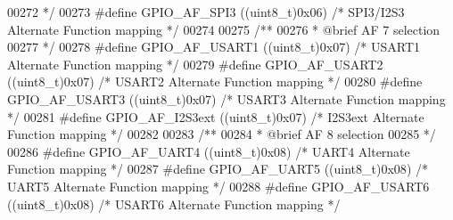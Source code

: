 \begin{DoxyCode}
00272 \textcolor{comment}{  */}
00273 \textcolor{preprocessor}{#}\textcolor{preprocessor}{define} \textcolor{preprocessor}{GPIO\_AF\_SPI3}          \textcolor{preprocessor}{(}\textcolor{preprocessor}{(}\textcolor{preprocessor}{uint8\_t}\textcolor{preprocessor}{)}0x06\textcolor{preprocessor}{)}  \textcolor{comment}{/* SPI3/I2S3 Alternate Function mapping */}
00274 
00275 \textcolor{comment}{/** }
00276 \textcolor{comment}{  * @brief   AF 7 selection  }
00277 \textcolor{comment}{  */}
00278 \textcolor{preprocessor}{#}\textcolor{preprocessor}{define} \textcolor{preprocessor}{GPIO\_AF\_USART1}        \textcolor{preprocessor}{(}\textcolor{preprocessor}{(}\textcolor{preprocessor}{uint8\_t}\textcolor{preprocessor}{)}0x07\textcolor{preprocessor}{)}  \textcolor{comment}{/* USART1 Alternate Function mapping */}
00279 \textcolor{preprocessor}{#}\textcolor{preprocessor}{define} \textcolor{preprocessor}{GPIO\_AF\_USART2}        \textcolor{preprocessor}{(}\textcolor{preprocessor}{(}\textcolor{preprocessor}{uint8\_t}\textcolor{preprocessor}{)}0x07\textcolor{preprocessor}{)}  \textcolor{comment}{/* USART2 Alternate Function mapping */}
00280 \textcolor{preprocessor}{#}\textcolor{preprocessor}{define} \textcolor{preprocessor}{GPIO\_AF\_USART3}        \textcolor{preprocessor}{(}\textcolor{preprocessor}{(}\textcolor{preprocessor}{uint8\_t}\textcolor{preprocessor}{)}0x07\textcolor{preprocessor}{)}  \textcolor{comment}{/* USART3 Alternate Function mapping */}
00281 \textcolor{preprocessor}{#}\textcolor{preprocessor}{define} \textcolor{preprocessor}{GPIO\_AF\_I2S3ext}       \textcolor{preprocessor}{(}\textcolor{preprocessor}{(}\textcolor{preprocessor}{uint8\_t}\textcolor{preprocessor}{)}0x07\textcolor{preprocessor}{)}  \textcolor{comment}{/* I2S3ext Alternate Function mapping */}
00282 
00283 \textcolor{comment}{/** }
00284 \textcolor{comment}{  * @brief   AF 8 selection  }
00285 \textcolor{comment}{  */}
00286 \textcolor{preprocessor}{#}\textcolor{preprocessor}{define} \textcolor{preprocessor}{GPIO\_AF\_UART4}         \textcolor{preprocessor}{(}\textcolor{preprocessor}{(}\textcolor{preprocessor}{uint8\_t}\textcolor{preprocessor}{)}0x08\textcolor{preprocessor}{)}  \textcolor{comment}{/* UART4 Alternate Function mapping */}
00287 \textcolor{preprocessor}{#}\textcolor{preprocessor}{define} \textcolor{preprocessor}{GPIO\_AF\_UART5}         \textcolor{preprocessor}{(}\textcolor{preprocessor}{(}\textcolor{preprocessor}{uint8\_t}\textcolor{preprocessor}{)}0x08\textcolor{preprocessor}{)}  \textcolor{comment}{/* UART5 Alternate Function mapping */}
00288 \textcolor{preprocessor}{#}\textcolor{preprocessor}{define} \textcolor{preprocessor}{GPIO\_AF\_USART6}        \textcolor{preprocessor}{(}\textcolor{preprocessor}{(}\textcolor{preprocessor}{uint8\_t}\textcolor{preprocessor}{)}0x08\textcolor{preprocessor}{)}  \textcolor{comment}{/* USART6 Alternate Function mapping */}

\end{DoxyCode}
